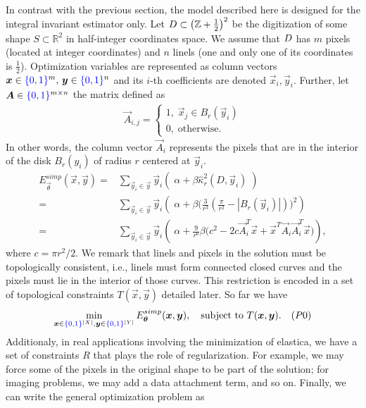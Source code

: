 In contrast with the previous section, the model described here is designed for the integral invariant estimator only. Let $D \subset \left( \mathbb{Z} + \frac{1}{2} \right)^2$ be the digitization of some shape $S \subset \mathbb{R}^2$ %
 in half-integer coordinates space. We assume that $D$ has $m$ pixels (located at integer coordinates) and $n$ linels (one and only one of its coordinates is $\frac{1}{2}$). Optimization variables are represented as column vectors $\bm{x} \in {\color{blue}{\{0,1\}}}^{m},\, \bm{y} \in {\color{blue}{\{0,1\}}}^{n}$ and its $i$-th coefficients are denoted  $\vec{x}_i,\vec{y}_i$.  Further, let $\bm{A} \in {\color{blue}{\{0,1\}}}^{m\times n}$ the matrix defined as
\begin{align*}
	\vec{A}_{i,j} = \left\{ \begin{array}{ll}
		1,\; \vec{x}_j \in B_{r}(\vec{y}_i)\\
		0,\; \text{otherwise}.
	\end{array}\right.
\end{align*}
%
In other words, the column vector $\vec{A}_i$ represents the pixels that are in the interior of the disk $B_{r}(y_i)$ of radius $r$ centered at $\vec{y}_i$. 
\begin{align}
	E_{\vec{\theta}}^{simp}(\vec{x},\vec{y}) =& \sum_{\vec{y}_i \in \vec{y}}{ \vec{y}_i \left(\; \alpha + \beta \hat{\kappa}_{r}^2(D,\vec{y}_i) \; \right)}\\\nonumber
			   =& \sum_{\vec{y}_i \in \vec{y}}{ \vec{y}_i \left(\; \alpha  + \beta \big( \frac{3}{r^3}(\frac{\pi}{r^2} - |B_r(\vec{y}_i)|)\big)^2\right)}\\\nonumber
			   =& \sum_{\vec{y}_i \in \vec{y}}{ \vec{y}_i \left(\; \alpha + \frac{9}{r^6}\beta \big(c^2 - 2c\vec{A}_i^T\vec{x} + \vec{x}^T\vec{A}_i\vec{A}_i^T\vec{x}\big)\right)},			   
	\end{align}
%	
where $c =  \pi r^2/2$. We remark that linels and pixels in the solution must be topologically consistent, i.e., linels must form connected closed curves and the pixels must lie in the interior of those curves. This restriction is encoded in a set of topological constraints $T(\vec{x},\vec{y})$ detailed later. So far we have
\begin{align*}
	\min_{\bm{x} \in {\color{blue}{\{0,1\}}}^{|X|}, \bm{y} \in {\color{blue}{\{0,1\}}}^{|Y|}}{E_{\bm{\theta}}^{simp}(\bm{x},\bm{y})}, \quad \text{subject to } T(\bm{x},\bm{y}). \quad (P0)
\end{align*}
%
Additionaly, in real applications involving the minimization of elastica, we have a set of constraints $R$ that plays the role of regularization. For example, we may force some of the pixels in the original shape to be part of the solution; for imaging problems, we may add a data attachment term, and so on. Finally, we can write the general optimization problem as
